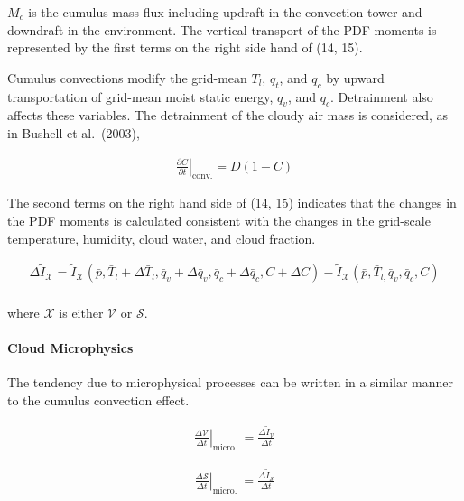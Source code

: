 \(M_c\) is the cumulus mass-flux including updraft in the convection
tower and downdraft in the environment. The vertical transport of the
PDF moments is represented by the first terms on the right side hand of
(14, 15).

Cumulus convections modify the grid-mean \(T_l\), \(q_t\), and \(q_c\)
by upward transportation of grid-mean moist static energy, \(q_v\), and
\(q_c\). Detrainment also affects these variables. The detrainment of
the cloudy air mass is considered, as in Bushell et al.~(2003),

\begin{eqnarray}
\left.\frac{\partial C}{\partial t}\right|_{\mathrm{conv} .}=D(1-C)
\end{eqnarray}

The second terms on the right hand side of (14, 15) indicates that the
changes in the PDF moments is calculated consistent with the changes in
the grid-scale temperature, humidity, cloud water, and cloud fraction.

\begin{eqnarray}
\Delta \tilde{I}_{\mathcal{X}}= \tilde{I}_{\mathcal{X}}\left(\bar{p}, \bar{T}_{l}+\Delta \bar{T}_{l}, \bar{q}_{v}+\Delta \bar{q}_{v}, \bar{q}_{c}+\Delta \bar{q}_{c}, C+\Delta C\right)
-\tilde{I}_{\mathcal{X}}\left(\bar{p}, \bar{T}_{l,} \bar{q}_{v}, \bar{q}_{c}, C\right)
\end{eqnarray}

\begin{eqnarray}
\label{W09-16}
\end{eqnarray} where \(\mathcal{X}\) is either \(\mathcal{V}\) or \(\mathcal{S}\).

\hypertarget{cloud-microphysics}{%
\paragraph{Cloud Microphysics}\label{cloud-microphysics}}

The tendency due to microphysical processes can be written in a similar
manner to the cumulus convection effect.

\begin{eqnarray}
\left.\frac{\Delta \mathcal{V}}{\Delta t}\right|_{\text {micro. }}=\frac{\Delta \tilde{I}_{\mathcal{V}}}{\Delta t}
\end{eqnarray}

\begin{eqnarray}
\left.\frac{\Delta \mathcal{S}}{\Delta t}\right|_{\text {micro. }}=\frac{\Delta \tilde{I}_{\mathcal{S}}}{\Delta t}
\end{eqnarray}

